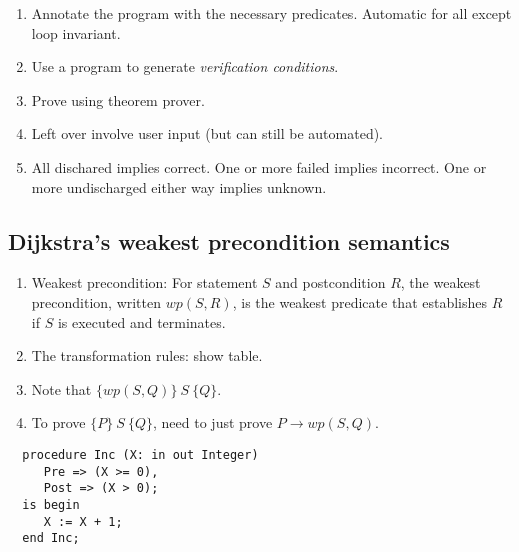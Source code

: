 \documentclass[11pt]{article}
\def\rootdir{../}
\begin{document}
\begin{enumerate}

 \item Annotate the program with the necessary predicates. Automatic for all except loop invariant.

 \item Use a program to generate \emph{verification conditions}. 

 \item Prove using theorem prover.

 \item Left over involve user input (but can still be automated).

 \item All dischared implies correct. One or more failed implies incorrect. One or more undischarged either way implies unknown.

\end{enumerate}

\subsection*{Dijkstra's weakest precondition semantics}


\begin{enumerate}

 \item Weakest precondition: For  statement $S$ and postcondition $R$, the weakest precondition, written $wp(S, R)$, is the weakest predicate that establishes $R$ if $S$ is executed and terminates.

 \item The transformation rules: show table.

 \item Note that $\{ wp(S, Q) \}~ S ~\{Q\}$.

 \item To prove $\{P\} ~S~ \{Q\}$, need to just prove $P \rightarrow wp(S, Q)$.

\end{enumerate}


\pagebreak

\lstset{language=Java}
\lstset{aboveskip=3mm}


\vfill

\lstset{language=Ada}
\lstset{aboveskip=3mm}
\begin{lstlisting}
  procedure Inc (X: in out Integer)
     Pre => (X >= 0),
     Post => (X > 0);
  is begin
     X := X + 1;
  end Inc;
\end{lstlisting}
 
\end{document}
